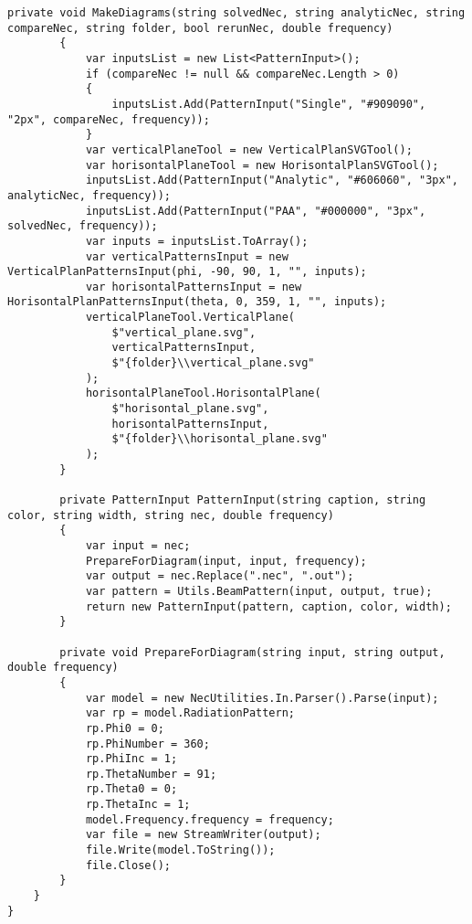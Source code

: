 \documentclass{scrartcl}
\begin{document}
\begin{lstlisting}[language={[Sharp]C}, caption={Experiment}, label={experiment}]
        private void MakeDiagrams(string solvedNec, string analyticNec, string compareNec, string folder, bool rerunNec, double frequency)
        {
            var inputsList = new List<PatternInput>();
            if (compareNec != null && compareNec.Length > 0)
            {
                inputsList.Add(PatternInput("Single", "#909090", "2px", compareNec, frequency));
            }
            var verticalPlaneTool = new VerticalPlanSVGTool();
            var horisontalPlaneTool = new HorisontalPlanSVGTool();
            inputsList.Add(PatternInput("Analytic", "#606060", "3px", analyticNec, frequency));
            inputsList.Add(PatternInput("PAA", "#000000", "3px", solvedNec, frequency));
            var inputs = inputsList.ToArray();
            var verticalPatternsInput = new VerticalPlanPatternsInput(phi, -90, 90, 1, "", inputs);
            var horisontalPatternsInput = new HorisontalPlanPatternsInput(theta, 0, 359, 1, "", inputs);
            verticalPlaneTool.VerticalPlane(
                $"vertical_plane.svg",
                verticalPatternsInput,
                $"{folder}\\vertical_plane.svg"
            );
            horisontalPlaneTool.HorisontalPlane(
                $"horisontal_plane.svg",
                horisontalPatternsInput,
                $"{folder}\\horisontal_plane.svg"
            );
        }

        private PatternInput PatternInput(string caption, string color, string width, string nec, double frequency)
        {
            var input = nec;
            PrepareForDiagram(input, input, frequency);
            var output = nec.Replace(".nec", ".out");
            var pattern = Utils.BeamPattern(input, output, true);
            return new PatternInput(pattern, caption, color, width);
        }

        private void PrepareForDiagram(string input, string output, double frequency)
        {
            var model = new NecUtilities.In.Parser().Parse(input);
            var rp = model.RadiationPattern;
            rp.Phi0 = 0;
            rp.PhiNumber = 360;
            rp.PhiInc = 1;
            rp.ThetaNumber = 91;
            rp.Theta0 = 0;
            rp.ThetaInc = 1;
            model.Frequency.frequency = frequency;
            var file = new StreamWriter(output);
            file.Write(model.ToString());
            file.Close();
        }
    }
}


\end{lstlisting}
\end{document}
